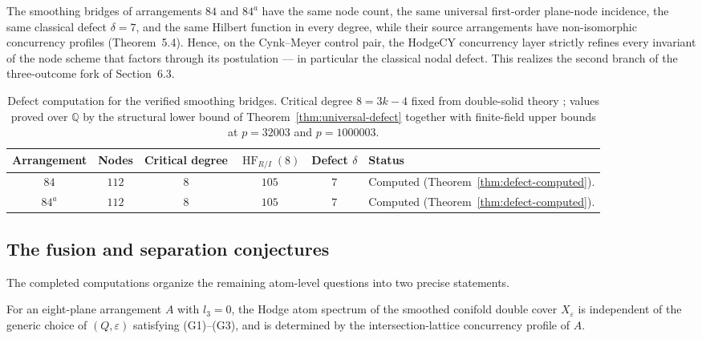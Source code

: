\begin{corollary}
\label{cor:strict-refinement}
The smoothing bridges of arrangements $84$ and $84^{a}$ have the same node
count, the same universal first-order plane-node incidence, the same
classical defect $\delta = 7$, and the same Hilbert function in every
degree, while their source arrangements have non-isomorphic concurrency
profiles (Theorem~5.4). Hence, on the Cynk--Meyer control pair, the
HodgeCY concurrency layer strictly refines every invariant of the node
scheme that factors through its postulation --- in particular the classical
nodal defect. This realizes the second branch of the three-outcome fork of
Section~6.3.
\end{corollary}

\begin{table}[htbp]
\caption{Defect computation for the verified smoothing bridges. Critical
degree $8 = 3k-4$ fixed from double-solid theory
\cite{Clemens83, CynkNodalOctics, Cheltsov, KloostermanDefect}; values
proved over $\mathbb{Q}$ by the structural lower bound of
Theorem~\ref{thm:universal-defect} together with finite-field upper bounds
at $p = 32003$ and $p = 1000003$.}
\begin{tabular}{cccccl}
\hline
Arrangement & Nodes & Critical degree & $\operatorname{HF}_{R/I}(8)$ &
Defect $\delta$ & Status \\
\hline
$84$   & $112$ & $8$ & $105$ & $7$ & Computed
  (Theorem~\ref{thm:defect-computed}). \\
$84^a$ & $112$ & $8$ & $105$ & $7$ & Computed
  (Theorem~\ref{thm:defect-computed}). \\
\hline
\end{tabular}
\end{table}

\subsection{The fusion and separation conjectures}
\label{sec:fusion-separation}

The completed computations organize the remaining atom-level questions into
two precise statements.

\begin{conjecture}[Fusion]\label{conj:fusion}
For an eight-plane arrangement $A$ with $l_3 = 0$, the Hodge atom spectrum
of the smoothed conifold double cover $X_\varepsilon$ is independent of the
generic choice of $(Q, \varepsilon)$ satisfying (G1)--(G3), and is
determined by the intersection-lattice concurrency profile of $A$.
\end{conjecture}


